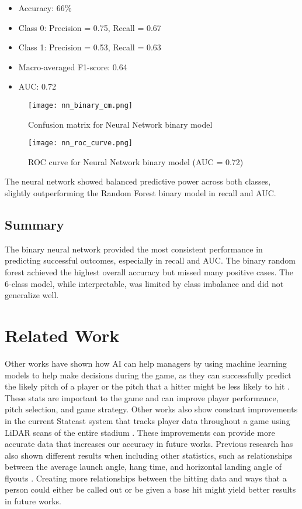 \documentclass[conference]{IEEEtran}
\begin{document}
\begin{itemize}
    \item Accuracy: 66\%
    \item Class 0: Precision = 0.75, Recall = 0.67
    \item Class 1: Precision = 0.53, Recall = 0.63
    \item Macro-averaged F1-score: 0.64
    \item AUC: 0.72
\end{itemize}

\begin{figure}[H]
    \centering
    \texttt{[image: nn\_binary\_cm.png]}
    \caption{Confusion matrix for Neural Network binary model}
    \label{fig:nn_binary_cm}
\end{figure}

\begin{figure}[H]
    \centering
    \texttt{[image: nn\_roc\_curve.png]}
    \caption{ROC curve for Neural Network binary model (AUC = 0.72)}
    \label{fig:nn_roc_curve}
\end{figure}

The neural network showed balanced predictive power across both classes, slightly outperforming the Random Forest binary model in recall and AUC.

\subsection{Summary}

The binary neural network provided the most consistent performance in predicting successful outcomes, especially in recall and AUC. The binary random forest achieved the highest overall accuracy but missed many positive cases. The 6-class model, while interpretable, was limited by class imbalance and did not generalize well.


\section{Related Work}
Other works have shown how AI can help managers by using machine learning models to help make decisions during the game, as they can successfully predict the likely pitch of a player or the pitch that a hitter might be less likely to hit \cite{b7}. These stats are important to the game and can improve player performance, pitch selection, and game strategy. Other works also show constant improvements in the current Statcast system that tracks player data throughout a game using LiDAR scans of the entire stadium \cite{b8}. These improvements can provide more accurate data that increases our accuracy in future works. Previous research has also shown different results when including other statistics, such as relationships between the average launch angle, hang time, and horizontal landing angle of flyouts \cite{b6}. Creating more relationships between the hitting data and ways that a person could either be called out or be given a base hit might yield better results in future works. 
\end{document}
